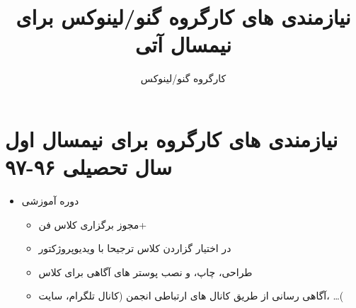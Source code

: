 \documentclass[a4paper,12pt]{article}
\author{کارگروه گنو/لینوکس}
\title{نیازمندی های کارگروه گنو/لینوکس برای نیمسال آتی}
\begin{document}
\maketitle

\tableofcontents
\newpage

\section{نیازمندی های کارگروه برای نیمسال اول سال تحصیلی ۹۶-۹۷}
\begin{itemize}
  \item دوره آموزشی
		\begin{itemize}
			\item مجوز برگزاری کلاس فن+
			\item در اختیار گزاردن کلاس ترجیحا با ویدیوپروژکتور
			\item طراحی، چاپ، و نصب پوستر های آگاهی برای کلاس
			\item آگاهی رسانی از طریق کانال های ارتباطی انجمن (کانال تلگرام، سایت، \ldots(
		\end{itemize}
\end{itemize}
\end{document}

